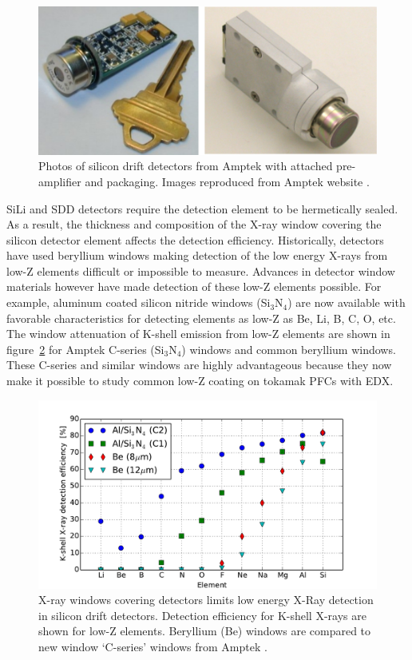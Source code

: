 \documentclass[12pt,letterpaper,final]{article}
\begin{document}
\begin{figure}[!h]
 \centering
  \includegraphics[width=\columnwidth]{figures/SDDPhoto_DoubleCol.pdf}
 \caption{Photos of silicon drift detectors from Amptek with attached pre-amplifier and packaging. Images reproduced from Amptek website \cite{Amptek}.}
 \label{fig:AmptekDetectors}
\end{figure}

SiLi and SDD detectors require the detection element to be hermetically sealed. As a result, the thickness and composition of the X-ray window covering the silicon detector element affects the detection efficiency. Historically, detectors have used beryllium windows making detection of the low energy X-rays from low-Z elements difficult or impossible to measure. Advances in detector window materials however have made detection of these low-Z elements possible.  For example, aluminum coated silicon nitride windows (Si$_3$N$_4$) are now available with favorable characteristics for detecting elements as low-Z as Be, Li, B, C, O, etc.  The window attenuation of K-shell emission from low-Z elements are shown in figure~\ref{fig:DetectorEff} for Amptek C-series (Si$_3$N$_4$) windows and common beryllium windows. These C-series and similar windows are highly advantageous because they now make it possible to study common low-Z coating on tokamak PFCs with EDX.

\begin{figure}[!h]
 \centering
  \includegraphics[width=\columnwidth]{figures/KShellDetectorEfficiency.pdf}
 \caption{X-ray windows covering detectors limits low energy X-Ray detection in silicon drift detectors. Detection efficiency for K-shell X-rays are shown for low-Z elements. Beryllium (Be) windows are compared to new window `C-series' windows from Amptek \cite{Amptek}. }
 \label{fig:DetectorEff}
\end{figure}
\end{document}
